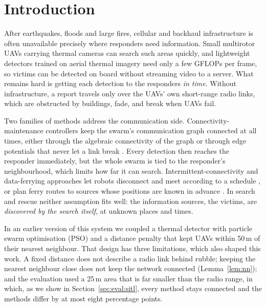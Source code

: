 \section{Introduction}\label{sec:intro}

After earthquakes, floods and large fires, cellular and backhaul infrastructure is often unavailable
precisely where responders need information. Small multirotor UAVs carrying thermal cameras can
search such areas quickly, and lightweight detectors trained on aerial thermal imagery
\cite{hituav} need only a few GFLOPs per frame, so victims can be detected on board without
streaming video to a server. What remains hard is
getting each detection to the responders \emph{in time}. Without infrastructure, a report travels
only over the UAVs' own short-range radio links, which are obstructed by buildings, fade, and break
when UAVs fail.

Two families of methods address the communication side. Connectivity-maintenance controllers keep
the swarm's communication graph connected at all times, either through the algebraic connectivity
of the graph \cite{sabattini2013,zavlanos2008} or through edge potentials that never let a link
break \cite{ji2007}. Every detection then reaches the responder immediately, but the whole swarm is
tied to the responder's neighbourhood, which limits how far it can search. Intermittent-connectivity
and data-ferrying approaches let robots disconnect and meet according to a schedule
\cite{kantaros2017}, or plan ferry routes to sources whose positions are known in advance
\cite{cui2023ferry,bafarassat2026aoi}. In search and rescue neither assumption fits well: the information
sources, the victims, are \emph{discovered by the search itself}, at unknown places and times.

In an earlier version of this system we coupled a thermal detector with particle swarm
optimisation (PSO) and a distance penalty that kept UAVs within 50\,m of their nearest neighbour.
That design has three limitations, which also shaped this work. A fixed distance does not describe
a radio link behind rubble; keeping the nearest neighbour close does not keep the network connected
(Lemma~\ref{lem:nn}); and the evaluation used a 25\,m area that is far smaller than the radio range,
in which, as we show in Section~\ref{sec:eval:sitl}, every method stays connected and the methods
differ by at most eight percentage points.

